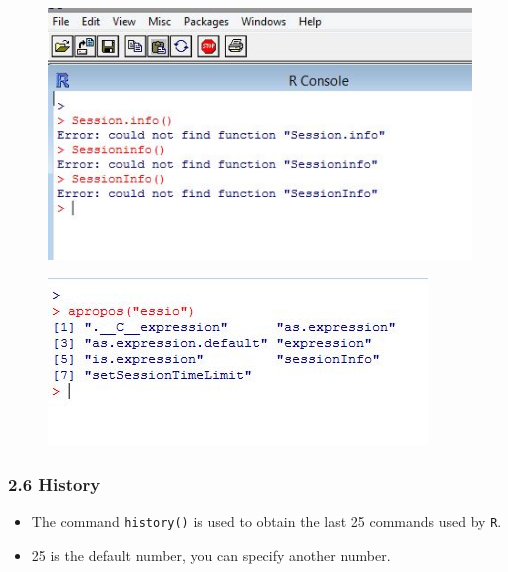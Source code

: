\documentclass{beamer}
\begin{document}
 		\begin{frame}
 			\begin{figure}
 				\centering
 				\includegraphics[width=1.2\linewidth]{images/Rapropos1}       
 			\end{figure}
 		\end{frame}   
 		\begin{frame}
 			\begin{figure}
 				\centering
 				\includegraphics[width=1.2\linewidth]{images/Rapropos2}       
 			\end{figure}
 		\end{frame}   
 	\begin{frame}
 		\frametitle{2.6 History}
 		\begin{itemize}
 			\item The command \texttt{history()} is used to obtain the last 25 commands used by \texttt{R}.
 			\item 25 is the default number, you can specify another number.
 		\end{itemize}
 		
 		
 	\end{frame}
\end{document}
